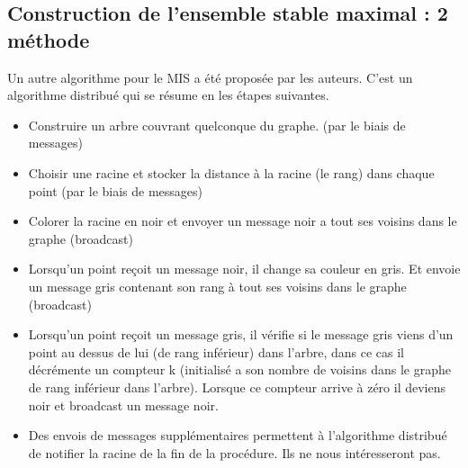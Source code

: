 \subsection{Construction de l'ensemble stable maximal : 2 méthode}
Un autre algorithme pour le MIS a été proposée par les auteurs. C'est un algorithme distribué qui se résume en les étapes suivantes.
\begin{itemize}
\item Construire un arbre couvrant quelconque du graphe. (par le biais de messages)
\item Choisir une racine et stocker la distance à la racine (le rang) dans chaque point (par le biais de messages)
\item Colorer la racine en noir et envoyer un message noir a tout ses voisins dans le graphe (broadcast)
\item Lorsqu'un point reçoit un message noir, il change sa couleur en gris. Et envoie un message gris contenant son rang à tout ses voisins dans le graphe (broadcast)
\item Lorsqu'un point reçoit un message gris, il vérifie si le message gris viens d'un point au dessus de lui (de rang inférieur) dans l'arbre, dans ce cas il décrémente un compteur k (initialisé a son nombre de voisins dans le graphe de rang inférieur dans l'arbre). Lorsque ce compteur arrive à zéro il deviens noir et broadcast un message noir.
\item Des envois de messages supplémentaires permettent à l'algorithme distribué de notifier la racine de la fin de la procédure. Ils ne nous intéresseront pas.
\end{itemize}

